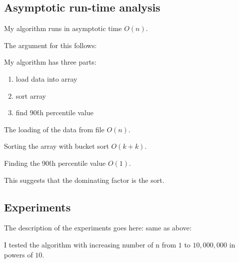 \documentclass{article}
\begin{document}
\subsection{Asymptotic run-time analysis}

My algorithm runs in asymptotic time $O(n)$. 

The argument for this follows:

My algorithm has three parts:
\begin{enumerate}
	\item load data into array
	\item sort array
	\item find 90\'th percentile value
\end{enumerate}

The loading of the data from file $O(n)$.

Sorting the array with bucket sort $O(k + k)$.

Finding the 90\'th percentile value $O(1)$.

This suggests that the dominating factor is the sort.


\subsection{Experiments}
\label{sec:experiments2}
The description of the experiments goes here: same as above:

I tested the algorithm with increasing number of n from $1$ to $10,000,000$ 
in powers of $10$.

\end{document}
